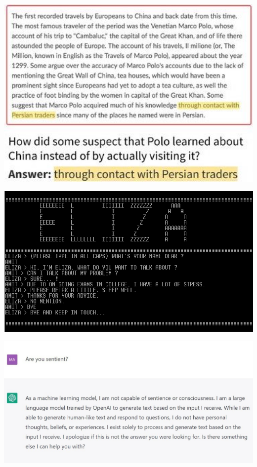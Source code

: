 \documentclass[landscape]{jhuslides3C}
\begin{document}
\vfill
\begin{center}
\includegraphics[width=20cm]{question-answering.jpeg}
\end{center}
\vfill


\vfill
\begin{center}
\includegraphics[width=25cm]{eliza.png}
\end{center}
\vfill


\vfill
\begin{center}
\includegraphics[width=25cm]{chatgpt.jpg}
\end{center}
\vfill
\end{document}
